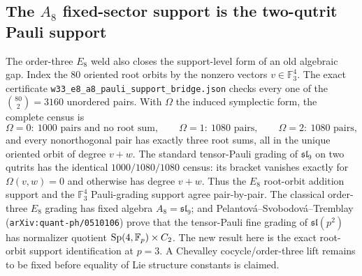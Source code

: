 \subsection{The $A_8$ fixed-sector support is the two-qutrit Pauli support}
The order-three $E_8$ weld also closes the support-level form of an old
algebraic gap.  Index the 80 oriented root orbits by the nonzero vectors
$v\in\mathbb F_3^4$.  The exact certificate
\texttt{w33\_e8\_a8\_pauli\_support\_bridge.json} checks every one of the
$\binom{80}{2}=3160$ unordered pairs.  With $\Omega$ the induced symplectic
form, the complete census is
\[
\Omega=0:\ 1000\text{ pairs and no root sum},\qquad
\Omega=1:\ 1080\text{ pairs},\qquad
\Omega=2:\ 1080\text{ pairs},
\]
and every nonorthogonal pair has exactly three root sums, all in the unique
oriented orbit of degree $v+w$.  The standard tensor-Pauli grading of
$\mathfrak{sl}_9$ on two qutrits has the identical $1000/1080/1080$ census:
its bracket vanishes exactly for $\Omega(v,w)=0$ and otherwise has degree
$v+w$.  Thus the $E_8$ root-orbit addition support and the
$\mathbb F_3^4$ Pauli-grading support agree pair-by-pair.
The classical order-three $E_8$ grading has fixed algebra $A_8=\mathfrak{sl}_9$;
and Pelantov\'a--Svobodov\'a--Tremblay
(\texttt{arXiv:quant-ph/0510106}) prove that the tensor-Pauli fine grading of
$\mathfrak{sl}(p^2)$ has normalizer quotient
$\mathrm{Sp}(4,\mathbb F_p)\times C_2$.  The new result here is the exact root-orbit
support identification at $p=3$.  A Chevalley cocycle/order-three lift remains
to be fixed before equality of Lie structure constants is claimed.
